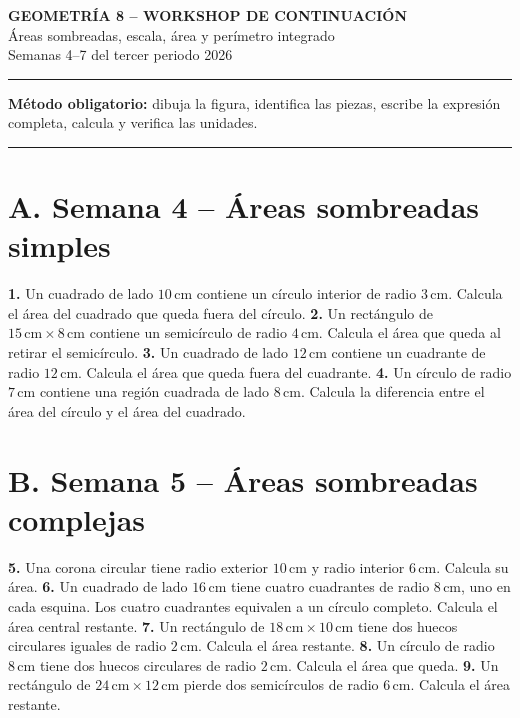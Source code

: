 \documentclass[11pt]{article}
\newcommand{\work}[1]{\vspace{#1}}
\begin{document}
\begin{center}
{\Large\bfseries GEOMETR\'IA 8 -- WORKSHOP DE CONTINUACI\'ON}\\[3pt]
{\large \'Areas sombreadas, escala, \'area y per\'imetro integrado}\\[3pt]
Semanas 4--7 del tercer periodo 2026
\end{center}
\hrule
\vspace{6pt}
\textbf{M\'etodo obligatorio:} dibuja la figura, identifica las piezas, escribe la expresi\'on completa, calcula y verifica las unidades.
\vspace{6pt}
\hrule
\section*{A. Semana 4 -- \'Areas sombreadas simples}
\textbf{1.} Un cuadrado de lado $10\,\mathrm{cm}$ contiene un c\'irculo interior de radio $3\,\mathrm{cm}$. Calcula el \'area del cuadrado que queda fuera del c\'irculo.
\work{2.0cm}
\textbf{2.} Un rect\'angulo de $15\,\mathrm{cm}\times 8\,\mathrm{cm}$ contiene un semic\'irculo de radio $4\,\mathrm{cm}$. Calcula el \'area que queda al retirar el semic\'irculo.
\work{2.0cm}
\textbf{3.} Un cuadrado de lado $12\,\mathrm{cm}$ contiene un cuadrante de radio $12\,\mathrm{cm}$. Calcula el \'area que queda fuera del cuadrante.
\work{2.0cm}
\textbf{4.} Un c\'irculo de radio $7\,\mathrm{cm}$ contiene una regi\'on cuadrada de lado $8\,\mathrm{cm}$. Calcula la diferencia entre el \'area del c\'irculo y el \'area del cuadrado.
\work{2.0cm}
\newpage
\section*{B. Semana 5 -- \'Areas sombreadas complejas}
\textbf{5.} Una corona circular tiene radio exterior $10\,\mathrm{cm}$ y radio interior $6\,\mathrm{cm}$. Calcula su \'area.
\work{2.1cm}
\textbf{6.} Un cuadrado de lado $16\,\mathrm{cm}$ tiene cuatro cuadrantes de radio $8\,\mathrm{cm}$, uno en cada esquina. Los cuatro cuadrantes equivalen a un c\'irculo completo. Calcula el \'area central restante.
\work{2.1cm}
\textbf{7.} Un rect\'angulo de $18\,\mathrm{cm}\times10\,\mathrm{cm}$ tiene dos huecos circulares iguales de radio $2\,\mathrm{cm}$. Calcula el \'area restante.
\work{2.1cm}
\textbf{8.} Un c\'irculo de radio $8\,\mathrm{cm}$ tiene dos huecos circulares de radio $2\,\mathrm{cm}$. Calcula el \'area que queda.
\work{2.1cm}
\textbf{9.} Un rect\'angulo de $24\,\mathrm{cm}\times12\,\mathrm{cm}$ pierde dos semic\'irculos de radio $6\,\mathrm{cm}$. Calcula el \'area restante.
\work{2.1cm}
\newpage
\end{document}
